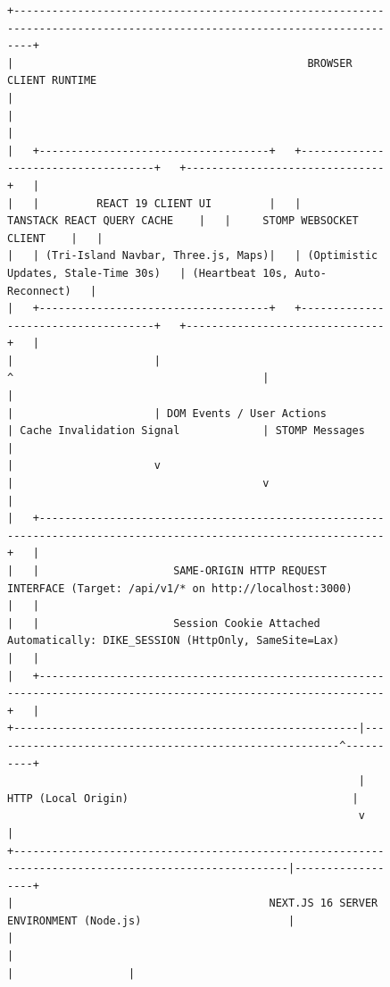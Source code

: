 \documentclass[conference,10pt,a4paper]{IEEEtran}
\begin{document}
\begin{figure}[!t]
\centering
\begin{lstlisting}[basicstyle=\ttfamily\fontsize{6pt}{7pt}\selectfont,frame=single,numbers=none]
+-------------------------------------------------------------------------------------------------------------------------+
|                                              BROWSER CLIENT RUNTIME                                                     |
|                                                                                                                         |
|   +------------------------------------+   +------------------------------------+   +-------------------------------+   |
|   |         REACT 19 CLIENT UI         |   |      TANSTACK REACT QUERY CACHE    |   |     STOMP WEBSOCKET CLIENT    |   |
|   | (Tri-Island Navbar, Three.js, Maps)|   | (Optimistic Updates, Stale-Time 30s)   | (Heartbeat 10s, Auto-Reconnect)   |
|   +------------------------------------+   +------------------------------------+   +-------------------------------+   |
|                      |                                       ^                                       |                  |
|                      | DOM Events / User Actions             | Cache Invalidation Signal             | STOMP Messages   |
|                      v                                       |                                       v                  |
|   +-----------------------------------------------------------------------------------------------------------------+   |
|   |                     SAME-ORIGIN HTTP REQUEST INTERFACE (Target: /api/v1/* on http://localhost:3000)             |   |
|   |                     Session Cookie Attached Automatically: DIKE_SESSION (HttpOnly, SameSite=Lax)                |   |
|   +-----------------------------------------------------------------------------------------------------------------+   |
+------------------------------------------------------|-------------------------------------------------------^----------+
                                                       | HTTP (Local Origin)                                   |
                                                       v                                                       |
+------------------------------------------------------------------------------------------------------|------------------+
|                                        NEXT.JS 16 SERVER ENVIRONMENT (Node.js)                       |                  |
|                                                                                                      |                  |

\end{lstlisting}
\end{figure}
\end{document}
